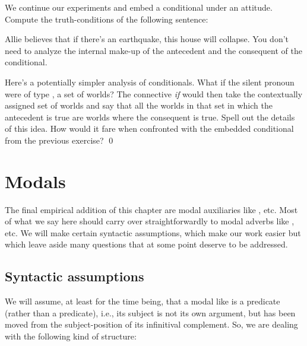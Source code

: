 \begin{exercise}
  We continue our experiments and embed a conditional under an attitude. Compute
  the truth-conditions of the following sentence:

  \ex\label{ex:embedded-if}
  Allie believes that if there's an earthquake, this house will collapse.
  \xe
  You don't need to analyze the internal make-up of the antecedent and the
  consequent of the conditional.
\end{exercise}

\begin{exercise}
  Here's a potentially simpler analysis of conditionals. What if the silent
  pronoun were of type , a set of worlds? The connective \emph{if}
  would then take the contextually assigned set of worlds and say that all
  the worlds in that set in which the antecedent is true are worlds where the
  consequent is true. Spell out the details of this idea. How would it fare when
  confronted with the embedded conditional  from the
  previous exercise? \qed 
\end{exercise}


\clearpage
\section{Modals}
\label{sec:modals}

The final empirical addition of this chapter are modal auxiliaries like
, etc. Most of what we say here should carry
over straightforwardly to modal adverbs like , etc. We will make certain syntactic assumptions, which make our
work easier but which leave aside many questions that at some point deserve to
be addressed.

\subsection{Syntactic assumptions} \label{sec:synt-assumpt-1}

%
We will assume, at least for the time being, that a modal like 
is a  predicate (rather than a  predicate), i.e.,
its subject is not its own argument, but has been moved from the
subject-position of its infinitival complement. So, we are dealing with the
following kind of structure:

